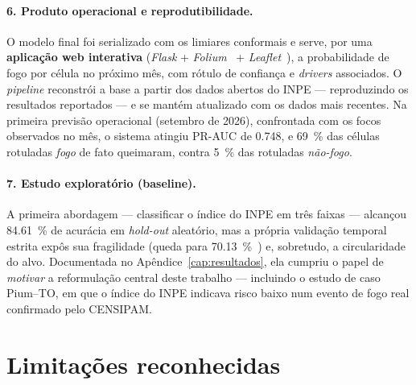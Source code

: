 \documentclass[tcc2]{uftex}
\begin{document}
\paragraph{6. Produto operacional e reprodutibilidade.} O modelo final foi serializado com os limiares conformais e serve, por uma \textbf{aplicação web interativa} (\emph{Flask} + \emph{Folium}~\cite{folium} + \emph{Leaflet}~\cite{leafletjs}), a probabilidade de fogo por célula no próximo mês, com rótulo de confiança e \emph{drivers} associados. O \emph{pipeline} reconstrói a base a partir dos dados abertos do INPE --- reproduzindo os resultados reportados --- e se mantém atualizado com os dados mais recentes. Na primeira previsão operacional (setembro de 2026), confrontada com os focos observados no mês, o sistema atingiu PR-AUC de \num{0,748}, e \SI{69}{\percent} das células rotuladas \emph{fogo} de fato queimaram, contra \SI{5}{\percent} das rotuladas \emph{não-fogo}.

\paragraph{7. Estudo exploratório (baseline).} A primeira abordagem --- classificar o índice do INPE em três faixas --- alcançou \SI{84,61}{\percent} de acurácia em \emph{hold-out} aleatório, mas a própria validação temporal estrita expôs sua fragilidade (queda para \SI{70,13}{\percent}~\cite{bergmeir2012cv}) e, sobretudo, a circularidade do alvo. Documentada no Apêndice~\ref{cap:resultados}, ela cumpriu o papel de \emph{motivar} a reformulação central deste trabalho --- incluindo o estudo de caso Pium--TO, em que o índice do INPE indicava risco baixo num evento de fogo real confirmado pelo CENSIPAM.

\section{Limitações reconhecidas}
\label{sec:conclusao_limitacoes}
\end{document}
